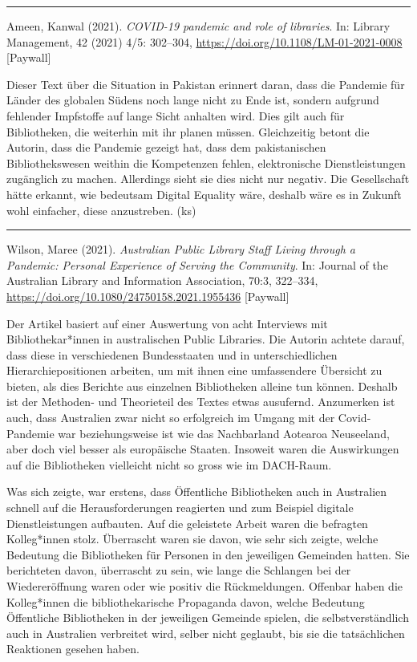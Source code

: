 \documentclass[a4paper,
fontsize=11pt,
oneside,
numbers=noperiodatend,
parskip=half-,
bibliography=totoc,
final
]{scrartcl}
\begin{document}
\begin{center}\rule{0.5\linewidth}{0.5pt}\end{center}

Ameen, Kanwal (2021). \emph{COVID-19 pandemic and role of libraries}.
In: Library Management, 42 (2021) 4/5: 302--304,
\url{https://doi.org/10.1108/LM-01-2021-0008} {[}Paywall{]}

Dieser Text über die Situation in Pakistan erinnert daran, dass die
Pandemie für Länder des globalen Südens noch lange nicht zu Ende ist,
sondern aufgrund fehlender Impfstoffe auf lange Sicht anhalten wird.
Dies gilt auch für Bibliotheken, die weiterhin mit ihr planen müssen.
Gleichzeitig betont die Autorin, dass die Pandemie gezeigt hat, dass dem
pakistanischen Bibliothekswesen weithin die Kompetenzen fehlen,
elektronische Dienstleistungen zugänglich zu machen. Allerdings sieht
sie dies nicht nur negativ. Die Gesellschaft hätte erkannt, wie
bedeutsam Digital Equality wäre, deshalb wäre es in Zukunft wohl
einfacher, diese anzustreben. (ks)

\begin{center}\rule{0.5\linewidth}{0.5pt}\end{center}

Wilson, Maree (2021). \emph{Australian Public Library Staff Living
through a Pandemic: Personal Experience of Serving the Community}. In:
Journal of the Australian Library and Information Association, 70:3,
322--334, \url{https://doi.org/10.1080/24750158.2021.1955436}
{[}Paywall{]}

Der Artikel basiert auf einer Auswertung von acht Interviews mit
Bibliothekar*innen in australischen Public Libraries. Die Autorin
achtete darauf, dass diese in verschiedenen Bundesstaaten und in
unterschiedlichen Hierarchiepositionen arbeiten, um mit ihnen eine
umfassendere Übersicht zu bieten, als dies Berichte aus einzelnen
Bibliotheken alleine tun können. Deshalb ist der Methoden- und
Theorieteil des Textes etwas ausufernd. Anzumerken ist auch, dass
Australien zwar nicht so erfolgreich im Umgang mit der Covid-Pandemie
war beziehungsweise ist wie das Nachbarland Aotearoa Neuseeland, aber
doch viel besser als europäische Staaten. Insoweit waren die
Auswirkungen auf die Bibliotheken vielleicht nicht so gross wie im
DACH-Raum.

Was sich zeigte, war erstens, dass Öffentliche Bibliotheken auch in
Australien schnell auf die Herausforderungen reagierten und zum Beispiel
digitale Dienstleistungen aufbauten. Auf die geleistete Arbeit waren die
befragten Kolleg*innen stolz. Überrascht waren sie davon, wie sehr sich
zeigte, welche Bedeutung die Bibliotheken für Personen in den jeweiligen
Gemeinden hatten. Sie berichteten davon, überrascht zu sein, wie lange
die Schlangen bei der Wiedereröffnung waren oder wie positiv die
Rückmeldungen. Offenbar haben die Kolleg*innen die bibliothekarische
Propaganda davon, welche Bedeutung Öffentliche Bibliotheken in der
jeweiligen Gemeinde spielen, die selbstverständlich auch in Australien
verbreitet wird, selber nicht geglaubt, bis sie die tatsächlichen
Reaktionen gesehen haben.
\end{document}

